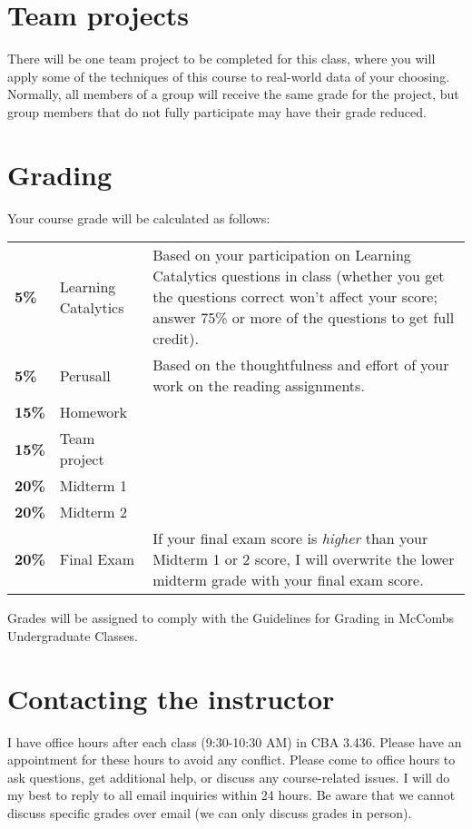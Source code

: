 \documentclass[12pt]{article}
\begin{document}
\section*{Team projects}

There will be one team project to be completed for this class, where you will apply some of the techniques of this course to real-world data of your choosing.  Normally, all members of a group will receive the same grade for the project, but group members that do not fully participate may have their grade reduced.  

\section*{Grading}

Your course grade will be calculated as follows:

\begin{tabular}{llp{4in}}
\textbf{5\%} & Learning Catalytics & Based on your participation on Learning Catalytics questions in class (whether you get the questions correct won't affect your score; answer 75\% or more of the questions to get full credit). \\
\textbf{5\%} & Perusall & Based on the thoughtfulness and effort of your work on the reading assignments. \\
\textbf{15\%} & Homework &  \\
\textbf{15\%} & Team project \\
\textbf{20\%} & Midterm 1 & \\
\textbf{20\%} & Midterm 2 & \\
\textbf{20\%} & Final Exam & If your final exam score is \emph{higher} than your Midterm 1 or 2 score, I will overwrite the lower midterm grade with your final exam score. \\
\end{tabular}
\renewcommand{\arraystretch}{1}

Grades will be assigned to comply with the Guidelines for Grading in McCombs Undergraduate Classes.

\section*{Contacting the instructor}

I have office hours after each class (9:30-10:30 AM) in CBA 3.436. Please have an appointment for these hours to avoid any conflict.  Please come to office hours to ask questions, get additional help, or discuss any course-related issues.  I will do my best to reply to all email inquiries within 24 hours. Be aware that we cannot discuss specific grades over email (we can only discuss grades in person).
\end{document}
